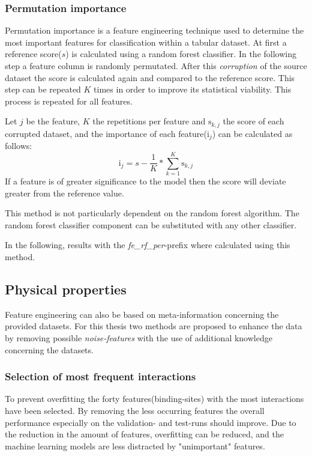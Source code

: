 \subsubsection*{Permutation importance}
Permutation importance is a feature engineering technique used to determine the most important features for classification within a tabular dataset.
At first a reference score($s$) is calculated using a random forest classifier. In the following step a feature column is randomly permutated.
After this \textit{corruption} of the source dataset the score is calculated again and compared to the reference score. This step can be repeated $K$ times in order
to improve its statistical viability. This process is repeated for all features.

Let $j$ be the feature, $K$ the repetitions per feature and $\mathrm{s}_{k,j}$ the score of each corrupted dataset, and the importance of each
feature($\mathrm{i}_{j}$) can be calculated as follows:
\begin{equation*}
    \mathrm{i}_{j} = s -\frac{1}{K}*\sum_{k=1}^{K} \mathrm{s}_{k,j}
\end{equation*}
If a feature is of greater significance to the model then the score will deviate greater from the reference value\cite[]{permutation_importance}.

This method is not particularly dependent on the random forest algorithm. The random forest classifier component can be substituted with any other classifier.

In the following, results with the \textit{fe\_rf\_per}-prefix where calculated using this method.

\subsection{Physical properties}
Feature engineering can also be based on meta-information concerning the provided datasets.
For this thesis two methods are proposed to enhance the data by removing possible \textit{noise-features} with the use of additional
knowledge concerning the datasets.
\subsubsection*{Selection of most frequent interactions}
To prevent overfitting the forty features(binding-sites) with the most interactions have been selected.
By removing the less occurring features the overall performance especially on the validation- and test-runs should improve.
Due to the reduction in the amount of features, overfitting can be reduced, and the machine learning models are less distracted by
"unimportant" features.


